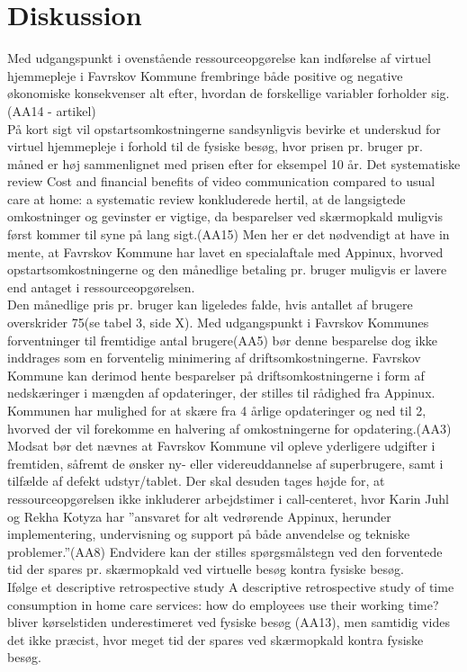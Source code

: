\section{Diskussion}
Med udgangspunkt i ovenstående ressourceopgørelse kan indførelse af virtuel hjemmepleje i Favrskov Kommune frembringe både positive og negative økonomiske konsekvenser alt efter, hvordan de forskellige variabler forholder sig. (AA14 - artikel)\\
På kort sigt vil opstartsomkostningerne sandsynligvis bevirke et underskud for virtuel hjemmepleje i forhold til de fysiske besøg, hvor prisen pr. bruger pr. måned er høj sammenlignet med prisen efter for eksempel 10 år. Det systematiske review Cost and financial benefits of video communication compared to usual care at home: a systematic review konkluderede hertil, at de langsigtede omkostninger og gevinster er vigtige, da besparelser ved skærmopkald muligvis først kommer til syne på lang sigt.(AA15) Men her er det nødvendigt at have in mente, at Favrskov Kommune har lavet en specialaftale med Appinux, hvorved opstartsomkostningerne og den månedlige betaling pr. bruger muligvis er lavere end antaget i ressourceopgørelsen.\\
Den månedlige pris pr. bruger kan ligeledes falde, hvis antallet af brugere overskrider 75(se tabel 3, side X). Med udgangspunkt i Favrskov Kommunes forventninger til fremtidige antal brugere(AA5) bør denne besparelse dog ikke inddrages som en forventelig minimering af driftsomkostningerne. 
Favrskov Kommune kan derimod hente besparelser på driftsomkostningerne i form af nedskæringer i mængden af opdateringer, der stilles til rådighed fra Appinux. Kommunen har mulighed for at skære fra 4 årlige opdateringer og ned til 2, hvorved der vil forekomme en halvering af omkostningerne for opdatering.(AA3)
Modsat bør det nævnes at Favrskov Kommune vil opleve yderligere udgifter i fremtiden, såfremt de ønsker ny- eller videreuddannelse af superbrugere, samt i tilfælde af defekt udstyr/tablet.  
Der skal desuden tages højde for, at ressourceopgørelsen ikke inkluderer arbejdstimer i call-centeret, hvor Karin Juhl og Rekha Kotyza har ”ansvaret for alt vedrørende Appinux, herunder implementering, undervisning og support på både anvendelse og tekniske problemer.”(AA8)
Endvidere kan der stilles spørgsmålstegn ved den forventede tid der spares pr. skærmopkald ved virtuelle besøg kontra fysiske besøg.\\
Ifølge et descriptive retrospective study A descriptive retrospective study of time consumption in home care services: how do employees use their working time? bliver kørselstiden underestimeret ved fysiske besøg (AA13),  men samtidig vides det ikke præcist, hvor meget tid der spares ved skærmopkald kontra fysiske besøg. \\
